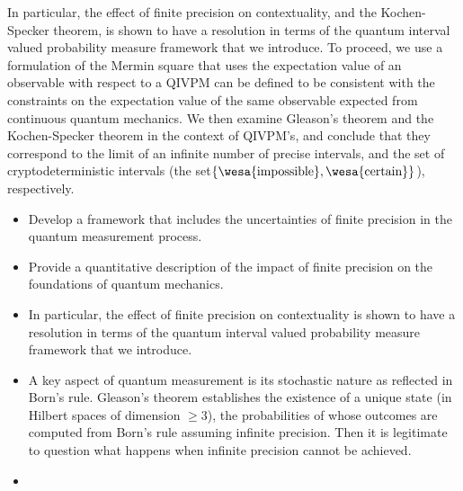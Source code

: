 \documentclass[english,reprint, aps, prl,superscriptaddress, showpacs,
showkeys, longbibliography, amsmath, amssymb]{revtex4-1}
\theoremstyle{plain}
\theoremstyle{definition}
\newcommand{\imposs}{{\text{\wesa{impossible}}}}
\newcommand{\necess}{{\text{\wesa{certain}}}}
\newcommand{\nb}{\nolinebreak[1] }
\begin{document}

In particular, the effect of finite precision on contextuality, and the Kochen-Specker theorem, is shown to have a resolution in terms of the quantum interval valued probability measure framework that we introduce.  To proceed, we use a formulation of the Mermin square that uses the
expectation value of an observable with respect
to a QIVPM can be defined to be consistent with the constraints on the
expectation value of the same observable expected from continuous
quantum mechanics.  We then examine Gleason's
theorem\nb\cite{gleason1957,Redhead1987-REDINA,peres1995quantum} and the
Kochen-Specker theorem in the context of QIVPM's, and conclude that
they correspond to the limit of an infinite number of precise
intervals, and the set of cryptodeterministic intervals (the set\nb$\{\imposs,\necess\}$),
respectively.




\begin{itemize}
\item Develop a framework that includes the uncertainties of finite precision in the quantum measurement process.
\item Provide a quantitative description of the impact of finite precision on the foundations of quantum mechanics.
\item In particular, the effect of finite precision on contextuality is shown to have a resolution in terms of the quantum interval valued probability measure framework that we introduce.
\item A key aspect of quantum measurement is its stochastic nature as reflected in Born's rule.  Gleason's theorem establishes the existence of a unique state (in Hilbert spaces of dimension $\ge 3$), the probabilities of whose outcomes are computed from Born's rule assuming infinite precision.  Then it is legitimate to question what happens when infinite precision cannot be achieved.
\item 
\end{itemize}
\end{document}
